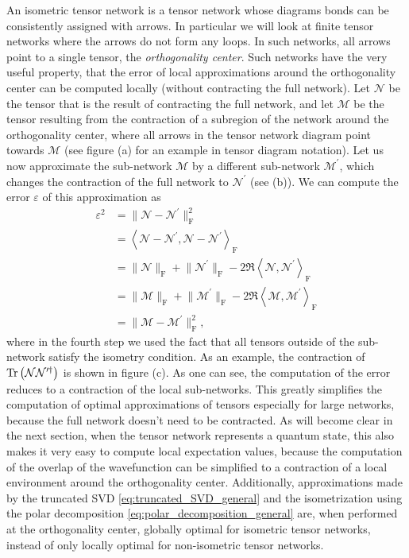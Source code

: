 An isometric tensor network is a tensor network whose diagrams bonds can be consistently assigned with arrows. In particular we will look at finite tensor networks where the arrows do not form any loops. In such networks, all arrows point to a single tensor, the \textit{orthogonality center}. Such networks have the very useful property, that the error of local approximations around the orthogonality center can be computed locally (without contracting the full network). Let $\mathcal{N}$ be the tensor that is the result of contracting the full network, and let $\mathcal{M}$ be the tensor resulting from the contraction of a subregion of the network around the orthogonality center, where all arrows in the tensor network diagram point towards $\mathcal{M}$ (see figure (a) for an example in tensor diagram notation). Let us now approximate the sub-network $\mathcal{M}$ by a different sub-network $\mathcal{M}^\prime$, which changes the contraction of the full network to $\mathcal{N}^\prime$ (see (b)). We can compute the error $\varepsilon$ of this approximation as
\begin{equation}
\begin{split}
	\varepsilon^2 &= \lVert\mathcal{N}-\mathcal{N}^\prime\rVert^2_\text{F} \\
	&=
	\left\langle\mathcal{N}-\mathcal{N}^\prime, \mathcal{N}-\mathcal{N}^\prime\right\rangle_\text{F} \\
	&= \lVert\mathcal{N}\rVert_\text{F} + \lVert\mathcal{N}^\prime\rVert_\text{F} - 2\Re\left\langle\mathcal{N},\mathcal{N}^\prime\right\rangle_\text{F} \\
	&= \lVert\mathcal{M}\rVert_\text{F} + \lVert\mathcal{M}^\prime\rVert_\text{F} - 2\Re\left\langle\mathcal{M},\mathcal{M}^\prime\right\rangle_\text{F} \\
	&= \lVert\mathcal{M}-\mathcal{M}^\prime\rVert^2_\text{F},
\end{split}
\end{equation}
where in the fourth step we used the fact that all tensors outside of the sub-network satisfy the isometry condition. As an example, the contraction of $\operatorname{Tr}\left(\mathcal{N}\mathcal{N}^{\prime\dagger}\right)$ is shown in figure (c). As one can see, the computation of the error reduces to a contraction of the local sub-networks. This greatly simplifies the computation of optimal approximations of tensors especially for large networks, because the full network doesn't need to be contracted. As will become clear in the next section, when the tensor network represents a quantum state, this also makes it very easy to compute local expectation values, because the computation of the overlap of the wavefunction can be simplified to a contraction of a local environment around the orthogonality center. Additionally, approximations made by the truncated SVD \ref{eq:truncated_SVD_general} and the isometrization using the polar decomposition \ref{eq:polar_decomposition_general} are, when performed at the orthogonality center, globally optimal for isometric tensor networks, instead of only locally optimal for non-isometric tensor networks.
